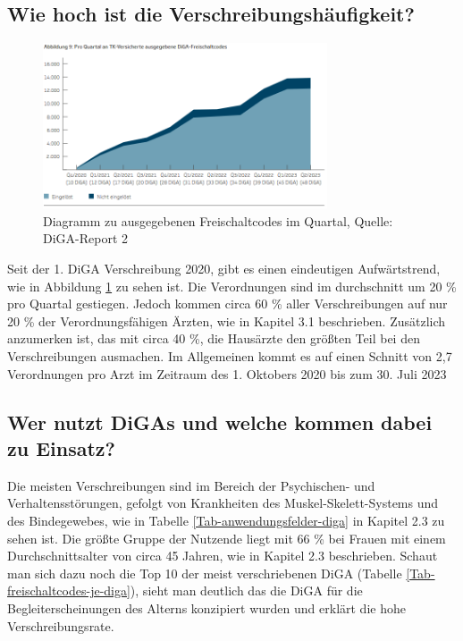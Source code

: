 \documentclass{article}
\begin{document}
		\subsection{Wie hoch ist die Verschreibungshäufigkeit?}
			\begin{figure}[htbp]
				\centering
				\includegraphics[width=0.75\textwidth]{./grafiken/abbildung-verschreibungstrend}
				\caption[Ausgegebene Freischaltcodes im Quartal]{Diagramm zu ausgegebenen Freischaltcodes im Quartal, Quelle: DiGA-Report 2 \cite{TK-Report-2}}
				\label{Abb-verschreibungstrend}
			\end{figure}
			Seit der 1. DiGA Verschreibung 2020, gibt es einen eindeutigen Aufwärtstrend, wie in Abbildung \ref{Abb-verschreibungstrend} zu sehen ist. Die Verordnungen sind im durchschnitt um 20 \% pro Quartal gestiegen. Jedoch kommen circa 60 \% aller Verschreibungen auf nur 20 \% der Verordnungsfähigen Ärzten, wie in Kapitel 3.1 beschrieben. Zusätzlich anzumerken ist, das mit circa 40 \%, die Hausärzte den größten Teil bei den Verschreibungen ausmachen. Im Allgemeinen kommt es auf einen Schnitt von 2,7 Verordnungen pro Arzt im Zeitraum des 1. Oktobers 2020 bis zum 30. Juli 2023   
		\subsection{Wer nutzt DiGAs und welche kommen dabei zu Einsatz?}
			Die meisten Verschreibungen sind im Bereich der Psychischen- und Verhaltensstörungen, gefolgt von Krankheiten des Muskel-Skelett-Systems und des Bindegewebes, wie in Tabelle \ref{Tab-anwendungsfelder-diga} in Kapitel 2.3 zu sehen ist. Die größte Gruppe der Nutzende liegt mit 66 \% bei Frauen mit einem Durchschnittsalter von circa 45 Jahren, wie in Kapitel 2.3 beschrieben. Schaut man sich dazu noch die Top 10 der meist verschriebenen DiGA (Tabelle \ref{Tab-freischaltcodes-je-diga}), sieht man deutlich das die DiGA für die Begleiterscheinungen des Alterns konzipiert wurden und erklärt die hohe Verschreibungsrate.                       
\end{document}
